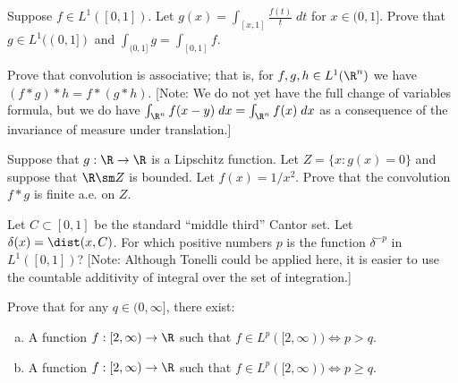 \begin{hw} \label{hw:41}
Suppose $f \in L^1([0, 1])$. Let $g(x)= \int_{[x, 1]} \frac{f(t)}{t} \;dt$ for $x \in (0,1]$. Prove that $g \in L^1((0, 1])$ and $\int_{(0, 1]} g= \int_{[0, 1]} f$. \\
\end{hw}


\begin{hw} \label{hw:42}
Prove that convolution is associative; that is, for $f, g, h \in L^1(\R^n)$ we have $(f*g)*h= f*(g*h)$. [Note: We do not yet have the full change of variables formula, but we do have $\int_{\R^n} f(x-y) \;dx= \int_{\R^n} f(x) \;dx$ as a consequence of the invariance of measure under translation.] \\
\end{hw}


\begin{hw} \label{hw:43}
Suppose that $g: \R \to \R$ is a Lipschitz function. Let $Z= \{ x \colon g(x)= 0 \}$ and suppose that $\R \sm Z$ is bounded. Let $f(x)=1/x^2$. Prove that the convolution $f*g$ is finite a.e. on $Z$. \\
\end{hw}


\begin{hw} \label{hw:44}
Let $C \subset [0, 1]$ be the standard ``middle third'' Cantor set. Let $\delta(x)= \dist(x,C)$. For which positive numbers $p$ is the function $\delta^{-p}$ in $L^1([0, 1])$? [Note: Although Tonelli could be applied here, it is easier to use the countable additivity of integral over the set of integration.] \\
\end{hw}






\begin{hw} \label{hw:45}
Prove that for any $q \in (0, \infty]$, there exist:  
        \begin{enumerate}[(a)]
        \item A function $f: [2, \infty) \to \R$ such that $f \in L^p([2, \infty)) \iff p > q$.
        \item A function $f: [2, \infty) \to \R$ such that $f \in L^p([2, \infty)) \iff p \geq q$. \\
        \end{enumerate}
 \\
\end{hw}


